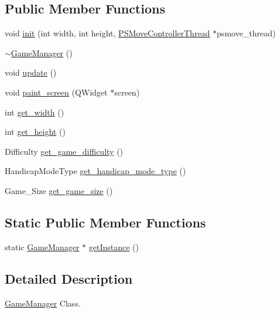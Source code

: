 \subsection*{Public Member Functions}
\begin{DoxyCompactItemize}
\item 
void \hyperlink{class_game_manager_a20ffdea8c56aa5d364554aa04eace73b}{init} (int width, int height, \hyperlink{class_p_s_move_controller_thread}{P\-S\-Move\-Controller\-Thread} $\ast$psmove\-\_\-thread)
\item 
\hyperlink{class_game_manager_aaae63e38e358379c1fe507c5197a8435}{$\sim$\-Game\-Manager} ()
\item 
void \hyperlink{class_game_manager_a7ecc3a14cd9e92f50729b37d1364953f}{update} ()
\item 
void \hyperlink{class_game_manager_adc2d500cc9ec8eaad8b9414b8eeffc97}{paint\-\_\-screen} (Q\-Widget $\ast$screen)
\item 
int \hyperlink{class_game_manager_a2c3a78c8ea991f7bdc2e7e935c791a88}{get\-\_\-width} ()
\item 
int \hyperlink{class_game_manager_a610beadc7ccea38d546dd17278e05a76}{get\-\_\-height} ()
\item 
Difficulty \hyperlink{class_game_manager_a67f07b08a9ecc6583af8c7d72682308a}{get\-\_\-game\-\_\-difficulty} ()
\item 
Handicap\-Mode\-Type \hyperlink{class_game_manager_a2b7b0e2c66eb7fcdfad952dffa108a3c}{get\-\_\-handicap\-\_\-mode\-\_\-type} ()
\item 
Game\-\_\-\-Size \hyperlink{class_game_manager_a3a2dcb0df5fd21caa872d68378311578}{get\-\_\-game\-\_\-size} ()
\end{DoxyCompactItemize}
\subsection*{Static Public Member Functions}
\begin{DoxyCompactItemize}
\item 
static \hyperlink{class_game_manager}{Game\-Manager} $\ast$ \hyperlink{class_game_manager_a00509384dd65ab52c7f3d22d1c7d74f1}{get\-Instance} ()
\end{DoxyCompactItemize}


\subsection{Detailed Description}
\hyperlink{class_game_manager}{Game\-Manager} Class. 

